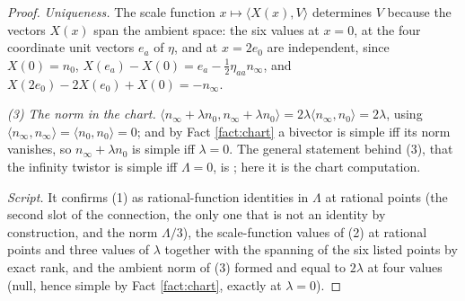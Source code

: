 \documentclass[11pt]{article}
\theoremstyle{definition}
\newcommand{\ip}[2]{\langle #1, #2\rangle}
\begin{document}
\begin{proof}
\emph{Uniqueness.} The scale function $x \mapsto \ip{X(x)}{V}$ determines $V$ because the vectors $X(x)$ span the ambient space: the six values at $x = 0$, at the four coordinate unit vectors $e_{a}$ of $\eta$, and at $x = 2e_{0}$ are independent, since $X(0) = n_{0}$, $X(e_{a}) - X(0) = e_{a} - \tfrac12\eta_{aa}n_{\infty}$, and $X(2e_{0}) - 2X(e_{0}) + X(0) = -n_{\infty}$.

\emph{(3) The norm in the chart.} $\ip{n_{\infty} + \lambda n_{0}}{n_{\infty} + \lambda n_{0}} = 2\lambda\ip{n_{\infty}}{n_{0}} = 2\lambda$, using $\ip{n_{\infty}}{n_{\infty}} = \ip{n_{0}}{n_{0}} = 0$; and by Fact \ref{fact:chart} a bivector is simple iff its norm vanishes, so $n_{\infty} + \lambda n_{0}$ is simple iff $\lambda = 0$. The general statement behind (3), that the infinity twistor is simple iff $\Lambda = 0$, is \cite[Cor.~4.8]{ButlerT9}; here it is the chart computation.

\emph{Script.} It confirms (1) as rational-function identities in $\Lambda$ at rational points (the second slot of the connection, the only one that is not an identity by construction, and the norm $\Lambda/3$), the scale-function values of (2) at rational points and three values of $\lambda$ together with the spanning of the six listed points by exact rank, and the ambient norm of (3) formed and equal to $2\lambda$ at four values (null, hence simple by Fact \ref{fact:chart}, exactly at $\lambda = 0$).
\end{proof}
\end{document}
